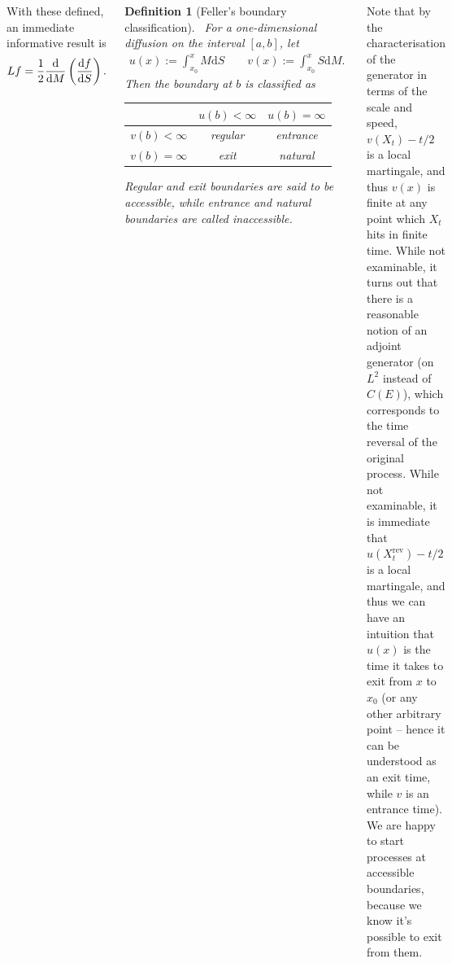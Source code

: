 \documentclass{tikzposter} %
\let\textd\d
\renewcommand{\d}{%
  \ifmmode
    \mathrm{d}%
  \else
    \textd%
  \fi
}
\newcommand\diff[2]{\ensuremath{\frac{\d #1}{\d #2}}}
\newtheorem{definition}{Definition}
\begin{document}
\begin{columns}
{    With these defined, an immediate informative result is
    \begin{align*}
      Lf = \frac{1}{2} \diff{}{M} \left(\diff{f}{S}\right).
    \end{align*}
    \begin{definition}[Feller's boundary classification]
    \ For a one-dimensional diffusion on the interval $[a, b]$, let
    \begin{align*}
      u(x) := \int_{x_0}^x M \mathrm{d}S \quad \quad v(x) := \int_{x_0}^x S \mathrm{d}M.
    \end{align*}
    Then the boundary at $b$ is classified as
    \begin{center}
    \begin{tabular}{c|cc}
      & $u(b) < \infty$ & $u(b) = \infty$ \\
      \hline
      $v(b) < \infty$ & regular & entrance \\
      $v(b) = \infty$ & exit & natural
    \end{tabular} 
    \end{center} 
    Regular and exit boundaries are said to be accessible, while entrance and natural boundaries are called inaccessible.
    \end{definition}
    \hphantom{}

    Note that by the characterisation of the generator in terms of the scale and speed, $v(X_t) - t/2$ is a local martingale, and thus $v(x)$ is finite at any point which $X_t$ hits in finite time. While not examinable, it turns out that there is a reasonable notion of an adjoint generator (on $L^2$ instead of $C(E)$), which corresponds to the time reversal of the original process. While not examinable, it is immediate that $u(X^{\mathrm{rev}}_t) - t/2$ is a local martingale, and thus we can have an intuition that $u(x)$ is the time it takes to exit from $x$ to $x_0$ (or any other arbitrary point -- hence it can be understood as an exit time, while $v$ is an entrance time). \\

    We are happy to start processes at accessible boundaries, because we know it's possible to exit from them. \\

}
\end{columns}
\end{document}
